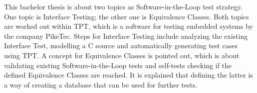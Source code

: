 This bachelor thesis is about two topics as Software-in-the-Loop test strategy. One topic is
Interface Testing; the other one is Equivalence Classes. Both topics are worked out within TPT, which
is a software for testing embedded systems by the company PikeTec. Steps for Interface Testing include
analyzing the existing Interface Test, modelling a C source and automatically generating test cases using TPT.
A concept for Equivalence Classes is pointed out, which is about validating existing Software-in-the-Loop tests
and self-tests checking if the defined Equivalence Classes are reached. It is explained that defining the latter is a way of creating
a database that can be used for further tests.